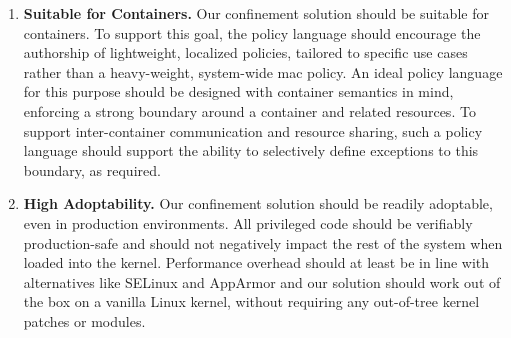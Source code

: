 \begin{enumerate}[font=\bfseries]
  \item \label{i:dg-suitability} \textbf{Suitable for Containers.}
    Our confinement solution should be suitable for containers. To support this goal, the
    policy language should encourage the authorship of lightweight, localized policies,
    tailored to specific use cases rather than a heavy-weight, system-wide \gls{mac}
    policy.  An ideal policy language for this purpose should be designed with container
    semantics in mind, enforcing a strong boundary around a container and related
    resources. To support inter-container communication and resource sharing, such
    a policy language should support the ability to selectively define exceptions to this
    boundary, as required.

  \item \label{i:dg-adoptability} \textbf{High Adoptability.}
    Our confinement solution should be readily adoptable, even in production environments.
    All privileged code should be verifiably production-safe and should not negatively
    impact the rest of the system when loaded into the kernel. Performance overhead should
    at least be in line with alternatives like SELinux and AppArmor and our solution
    should work out of the box on a vanilla Linux kernel, without requiring any
    out-of-tree kernel patches or modules.

\end{enumerate}

